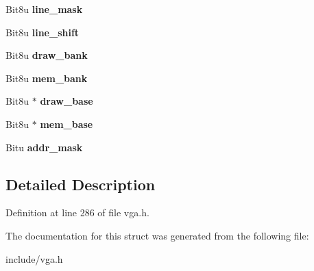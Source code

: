 \begin{DoxyCompactItemize}
\item 
\hypertarget{structVGA__TANDY_ac11ab0eacb74d36a4a3dd6aaf37a686f}{Bit8u {\bfseries line\-\_\-mask}}\label{structVGA__TANDY_ac11ab0eacb74d36a4a3dd6aaf37a686f}

\item 
\hypertarget{structVGA__TANDY_ae12c0fcf6c249e111c6234f01b8cf248}{Bit8u {\bfseries line\-\_\-shift}}\label{structVGA__TANDY_ae12c0fcf6c249e111c6234f01b8cf248}

\item 
\hypertarget{structVGA__TANDY_a5b6d47ade55349d0a33eb63e54395287}{Bit8u {\bfseries draw\-\_\-bank}}\label{structVGA__TANDY_a5b6d47ade55349d0a33eb63e54395287}

\item 
\hypertarget{structVGA__TANDY_a7387ac0d3b061d599ce1afe53910beef}{Bit8u {\bfseries mem\-\_\-bank}}\label{structVGA__TANDY_a7387ac0d3b061d599ce1afe53910beef}

\item 
\hypertarget{structVGA__TANDY_a3e2211caf88d83cc8288bed2fa5fa0af}{Bit8u $\ast$ {\bfseries draw\-\_\-base}}\label{structVGA__TANDY_a3e2211caf88d83cc8288bed2fa5fa0af}

\item 
\hypertarget{structVGA__TANDY_a5e9ff0bd5345f4fb3e7e9e6e5bd2ccad}{Bit8u $\ast$ {\bfseries mem\-\_\-base}}\label{structVGA__TANDY_a5e9ff0bd5345f4fb3e7e9e6e5bd2ccad}

\item 
\hypertarget{structVGA__TANDY_a844355a014b601bccd7728ccc140935e}{Bitu {\bfseries addr\-\_\-mask}}\label{structVGA__TANDY_a844355a014b601bccd7728ccc140935e}

\end{DoxyCompactItemize}


\subsection{Detailed Description}


Definition at line 286 of file vga.\-h.



The documentation for this struct was generated from the following file\-:\begin{DoxyCompactItemize}
\item 
include/vga.\-h\end{DoxyCompactItemize}
